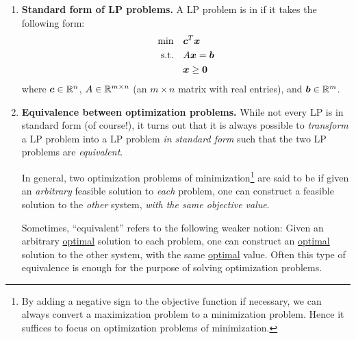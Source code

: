 \begin{enumerate}
\item \textbf{Standard form of LP problems.} A LP problem is in  if it takes the following form:
\begin{align*}
\text{min}\quad&\bm{c}^{T}\bm{x} \\
\text{s.t.}\quad&A\bm{x}=\bm{b} \\
&\bm{x}\ge \bm{0}
\end{align*}
where \(\bm{c}\in\mathbb{R}^n\), \(A\in\mathbb{R}^{m\times n}\) (an \(m\times n\) matrix with
real entries), and \(\bm{b}\in\mathbb{R}^m\).


\item \textbf{Equivalence between optimization problems.} While not every LP is in
standard form (of course!), it turns out that it is always possible to
\emph{transform} a LP problem into a LP problem \emph{in standard form} such
that the two LP problems are \emph{equivalent}.

In general, two optimization problems of minimization\footnote{By adding a
negative sign to the objective function if necessary, we can always convert a
maximization problem to a minimization problem. Hence it suffices to focus on
optimization problems of minimization.} are said to be  if
given an \emph{arbitrary} feasible solution to \emph{each} problem, one can
construct a feasible solution to the \emph{other} system, \emph{with the same
objective value}.
\begin{note}
Sometimes, ``equivalent'' refers to the following weaker notion: Given an
arbitrary \underline{optimal} solution to each problem, one can construct an
\underline{optimal} solution to the other system, with the same
\underline{optimal} value. Often this type of equivalence is enough for the
purpose of solving optimization problems.
\end{note}


\end{enumerate}
